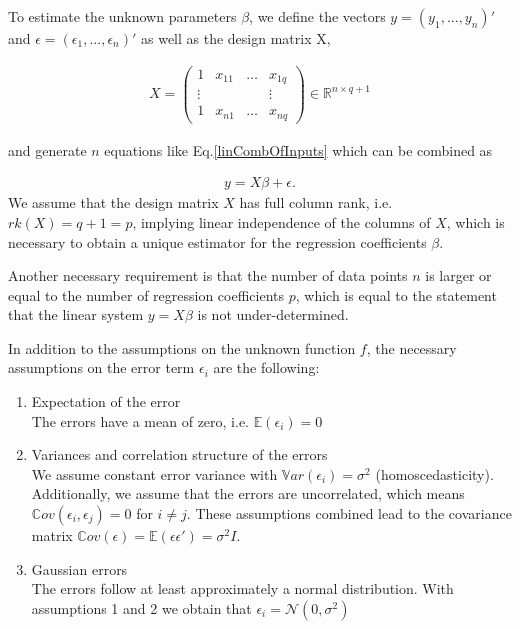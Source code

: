 \documentclass[10pt,a4paper]{article}
\begin{document}
To estimate the unknown parameters $\beta$, we define the vectors $y = (y_1, ..., y_n)'$ and $\epsilon = (\epsilon_1, ..., \epsilon_n)'$ as well as the design matrix X, 

\begin{align}
	X = \begin{pmatrix}   1     & x_{11} & \dots & x_{1q} \\ 
					 	 \vdots &        &       & \vdots \\ 
				  		  1     & x_{n1} & \dots & x_{nq}  
		\end{pmatrix} \in \mathbb{R}^{n \times q+1}		
\end{align}

and generate $n$ equations like Eq.\ref{linCombOfInputs} which can be combined as 

\begin{align}
	y = X\beta + \epsilon.
\end{align}
We assume that the design matrix $X$ has full column rank, i.e. $rk(X) = q + 1 = p$, implying linear independence of the columns of $X$, which is necessary to obtain a unique estimator for the regression coefficients $\beta$. 

Another necessary requirement is that the number of data points $n$ is larger or equal to the number of regression coefficients $p$, which is equal to the statement that the linear system $y = X\beta$ is not under-determined.

In addition to the assumptions on the unknown function $f$, the necessary assumptions on the error term $\epsilon_i$ are the following:

\begin{enumerate}
	\item Expectation of the error \\
	The errors have a mean of zero, i.e. $\mathbb E(\epsilon_i) = 0$

	\item Variances and correlation structure of the errors \\
	We assume constant error variance with $\mathbb Var(\epsilon_i) = \sigma^2$ (homoscedasticity). Additionally, we assume that the errors are uncorrelated, which means $\mathbb Cov(\epsilon_i, \epsilon_j) = 0$ for $i \ne j$. These assumptions combined lead to the covariance matrix $\mathbb Cov(\epsilon) = \mathbb E(\epsilon \epsilon') 	= \sigma^2 I$.

	\item Gaussian errors \\
	The errors follow at least approximately a normal distribution. With assumptions 1 and 2 we obtain that $\epsilon_i = \mathcal N(0, \sigma^2)$ 
\end{enumerate}
\end{document}
